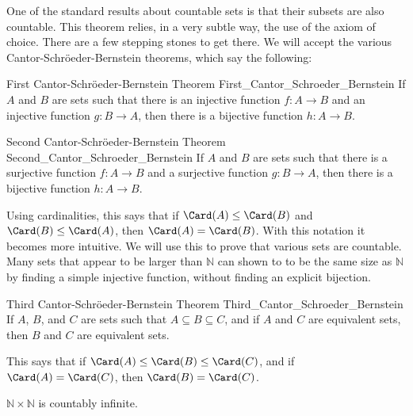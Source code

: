         One of the standard results about countable sets is
        that their subsets are also countable. This theorem
        relies, in a very subtle way, the use of the axiom
        of choice. There are a few stepping stones to get
        there. We will accept the various
        Cantor-Schr\"{o}eder-Bernstein theorems, which say
        the following:
        \begin{ltheorem}
              {First Cantor-Schr\"{o}eder-Bernstein Theorem}
              {First_Cantor_Schroeder_Bernstein}
            If $A$ and $B$ are sets such that there is an injective
            function $f:A\rightarrow{B}$ and an injective function
            $g:B\rightarrow{A}$, then there is a bijective function
            $h:A\rightarrow{B}$.
        \end{ltheorem}
        \begin{ltheorem}
              {Second Cantor-Schr\"{o}eder-Bernstein Theorem}
              {Second_Cantor_Schroeder_Bernstein}
            If $A$ and $B$ are sets such that there is a surjective
            function $f:A\rightarrow{B}$ and a surjective function
            $g:B\rightarrow{A}$, then there is a bijective function
            $h:A\rightarrow{B}$.
        \end{ltheorem}
        \par\hfill\par
        Using cardinalities, this says that if
        $\Card(A)\leq\Card(B)$ and $\Card(B)\leq\Card(A)$, then
        $\Card(A)=\Card(B)$. With this notation it becomes more
        intuitive. We will use this to prove that various sets are
        countable. Many sets that appear to be larger than $\mathbb{N}$
        can shown to to be the same size as $\mathbb{N}$ by finding
        a simple injective function, without finding an explicit
        bijection.
        \begin{ltheorem}
              {Third Cantor-Schr\"{o}eder-Bernstein Theorem}
              {Third_Cantor_Schroeder_Bernstein}
            If $A$, $B$, and $C$ are sets such that
            $A\subseteq{B}\subseteq{C}$, and if $A$ and $C$ are equivalent
            sets, then $B$ and $C$ are equivalent sets.
        \end{ltheorem}
        \par\hfill\par
        This says that if $\Card(A)\leq\Card(B)\leq\Card(C)$,
        and if $\Card(A)=\Card(C)$, then $\Card(B)=\Card(C)$.
        \begin{theorem}
            \label{thm:Measure_Theory_NxN_Is_Countable}
            $\mathbb{N}\times\mathbb{N}$ is countably infinite.
        \end{theorem}

